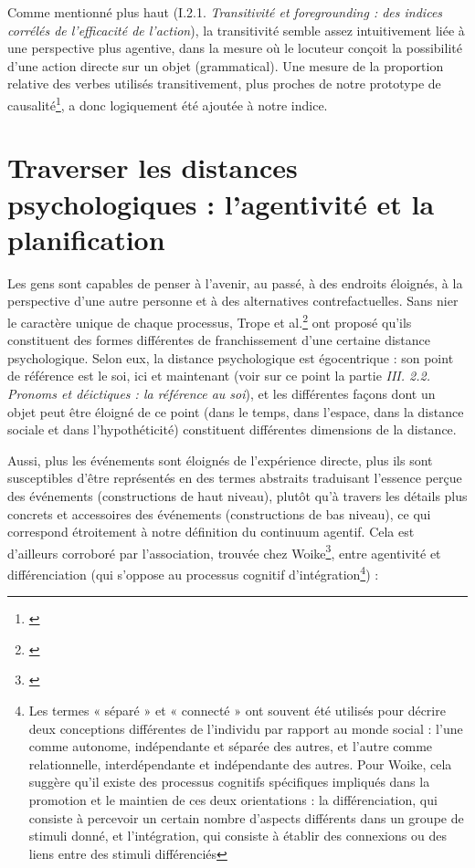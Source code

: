 Comme mentionné plus haut (I.2.1. \textit{Transitivité et foregrounding : des indices corrélés de l'efficacité de l'action}), la transitivité semble assez intuitivement liée à une perspective plus agentive, dans la mesure où le locuteur conçoit la possibilité d'une action directe sur un objet (grammatical). Une mesure de la proportion relative des verbes utilisés transitivement, plus proches de notre prototype de causalité\footnote{\cite{konopasky_towards_2016}}, a donc logiquement été ajoutée à notre indice.

\chapter{Traverser les distances psychologiques : l’agentivité et la planification}

Les gens sont capables de penser à l'avenir, au passé, à des endroits éloignés, à la perspective d'une autre personne et à des alternatives contrefactuelles. Sans nier le caractère unique de chaque processus, Trope et al.\footnote{\cite{trope_construal-level_2010}} ont proposé qu'ils constituent des formes différentes de franchissement d'une certaine distance psychologique. Selon eux, la distance psychologique est égocentrique : son point de référence est le soi, ici et maintenant (voir sur ce point la partie \textit{III. 2.2. Pronoms et déictiques : la référence au soi}), et les différentes façons dont un objet peut être éloigné de ce point (dans le temps, dans l'espace, dans la distance sociale et dans l'hypothéticité) constituent différentes dimensions de la distance. 

Aussi, plus les événements sont éloignés de l'expérience directe, plus ils sont susceptibles d'être représentés en des termes abstraits traduisant l'essence perçue des événements (constructions de haut niveau), plutôt qu'à travers les détails plus concrets et accessoires des événements (constructions de bas niveau), ce qui correspond étroitement à notre définition du continuum agentif. Cela est d'ailleurs corroboré par l’association, trouvée chez Woike\footnote{\cite{woike_use_1994}}, entre agentivité et différenciation (qui s'oppose au processus cognitif d’intégration\footnote{Les termes « séparé » et « connecté » ont souvent été utilisés pour décrire
deux conceptions différentes de l'individu par rapport au monde social : l'une comme autonome, indépendante et séparée des autres, et l'autre comme relationnelle, interdépendante et indépendante des autres. Pour Woike, cela suggère qu'il existe des processus cognitifs spécifiques impliqués dans la promotion et le maintien de ces deux orientations : la différenciation, qui consiste à percevoir un certain nombre d'aspects différents dans un groupe de stimuli donné, et l'intégration, qui consiste à établir des connexions ou des liens entre des stimuli différenciés}) : 

